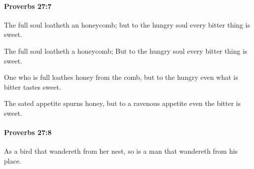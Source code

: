 		\paragraph{Proverbs 27:7} %
			\label{PROVERBS-27-7}

			The full soul loatheth an honeycomb; but to the hungry soul every bitter thing is sweet.

			\begin{versebox}
					\item[BHS] 
					\item[ASV] The full soul loatheth a honeycomb; But to the hungry soul every bitter thing is sweet.
					\item[NIV] One who is full loathes honey from the comb, but to the hungry even what is bitter tastes sweet.
					\item[NRSV] The sated appetite spurns honey, but to a ravenous appetite even the bitter is sweet.
			\end{versebox}

		\paragraph{Proverbs 27:8} %
			\label{PROVERBS-27-8}

			As a bird that wandereth from her nest, so is a man that wandereth from his place.

